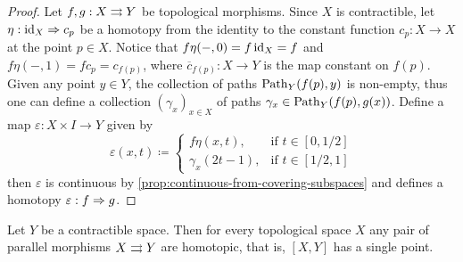 \begin{proof}
    Let \(f, g: X \rightrightarrows Y\) be topological morphisms. Since \(X\) is contractible,
    let \(\eta: \operatorname{id}_X \Rightarrow c_p\) be a homotopy from the identity to the constant
    function \(c_p: X \to X\) at the point \(p \in X\). Notice that
    \(f \eta(-, 0) = f \operatorname{id}_X = f\) and \(f \eta(-, 1) = f c_p = c_{f(p)}\), where
    \(\overline{c}_{f(p)}: X \to Y\) is the map constant on \(f(p)\). Given any point
    \(y \in Y\), the collection of paths
    \(\operatorname{Path}_Y(f(p), y)\) is non-empty, thus one can define a collection
    \((\gamma_x)_{x \in X}\) of paths \(\gamma_x \in \operatorname{Path}_Y(f(p), g(x))\). Define a
    map \(\varepsilon: X \times I \to Y\) given by
    \[
        \varepsilon(x, t) \coloneq
        \begin{cases}
            f \eta(x, t),     & \text{if } t \in [0, 1/2] \\
            \gamma_x(2t - 1), & \text{if } t \in [1/2, 1]
        \end{cases}
    \]
    then \(\varepsilon\) is continuous by
    \cref{prop:continuous-from-covering-subspaces} and defines a homotopy
    \(\varepsilon: f \Rightarrow g\).
\end{proof}

\begin{corollary}
    \label{cor:contractible-then-maps-to-space-are-homotopic}
    Let \(Y\) be a contractible space. Then for every topological space \(X\) any
    pair of parallel morphisms \(X \rightrightarrows Y\) are homotopic, that is, \([X, Y]\) has
    a single point.
\end{corollary}

